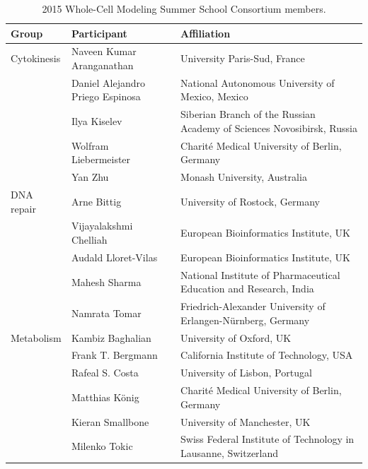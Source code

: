 \documentclass[journal,transmag]{IEEEtran}
\begin{document}
\begin{table}[ht!]
\caption{2015 Whole-Cell Modeling Summer School Consortium members.}
\begin{tabularx}{\textwidth}{l||l||X}\hline
\bfseries Group        & \bfseries Participant            & \bfseries Affiliation\\\hline\hline
Cytokinesis            & Naveen Kumar Aranganathan        & University Paris-Sud, France\\
                       & Daniel Alejandro Priego Espinosa & National Autonomous University of Mexico, Mexico\\
                       & Ilya Kiselev                     & Siberian Branch of the Russian Academy of Sciences Novosibirsk, Russia\\
                       & Wolfram Liebermeister            & Charit\'e Medical University of Berlin, Germany\\
                       & Yan Zhu                          & Monash University, Australia\\\hline
DNA repair             & Arne Bittig                      & University of Rostock, Germany\\
                       & Vijayalakshmi Chelliah           & European Bioinformatics Institute, UK\\
                       & Audald Lloret-Vilas              & European Bioinformatics Institute, UK\\
                       & Mahesh Sharma                    & National Institute of Pharmaceutical Education and Research, India\\
                       & Namrata Tomar                    & Friedrich-Alexander University of Erlangen-N\"urnberg, Germany\\\hline
Metabolism             & Kambiz Baghalian                 & University of Oxford, UK\\
                       & Frank T. Bergmann                & California Institute of Technology, USA\\
                       & Rafeal S. Costa                  & University of Lisbon, Portugal\\
                       & Matthias K\"onig                 & Charit\'e Medical University of Berlin, Germany\\
                       & Kieran Smallbone                 & University of Manchester, UK\\
                       & Milenko Tokic                    & Swiss Federal Institute of Technology in Lausanne, Switzerland\\\hline

\end{tabularx}
\end{table}
\end{document}
